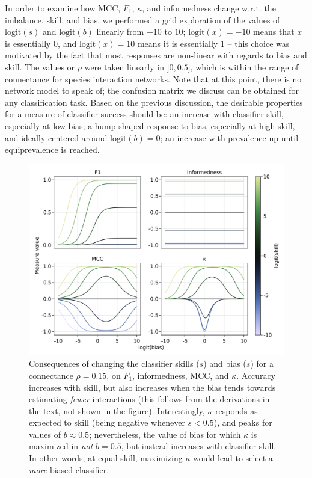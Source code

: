 \documentclass[11pt]{article}
\makeatletter
\def\maxwidth{\ifdim\Gin@nat@width>\linewidth\linewidth
\else\Gin@nat@width\fi}
\let\Oldincludegraphics\includegraphics
\renewcommand{\includegraphics}[1]{\Oldincludegraphics[width=\maxwidth]{#1}}
\makeatother
\begin{document}
In order to examine how MCC, \(F_1\), \(\kappa\), and informedness
change w.r.t. the imbalance, skill, and bias, we performed a grid
exploration of the values of \(\text{logit}(s)\) and \(\text{logit}(b)\)
linearly from \(-10\) to \(10\); \(\text{logit}(x) = -10\) means that
\(x\) is essentially 0, and \(\text{logit}(x) = 10\) means it is
essentially 1 -- this choice was motivated by the fact that most
responses are non-linear with regards to bias and skill. The values or
\(\rho\) were taken linearly in \(]0, 0.5]\), which is within the range
of connectance for species interaction networks. Note that at this
point, there is no network model to speak of; the confusion matrix we
discuss can be obtained for any classification task. Based on the
previous discussion, the desirable properties for a measure of
classifier success should be: an increase with classifier skill,
especially at low bias; a hump-shaped response to bias, especially at
high skill, and ideally centered around \(\text{logit}(b)=0\); an
increase with prevalence up until equiprevalence is reached.

\begin{figure}
\hypertarget{fig:bias}{%
\centering
\includegraphics{figures/changing-bias.png}
\caption{Consequences of changing the classifier skills (\(s\)) and bias
(\(s\)) for a connectance \(\rho=0.15\), on \(F_1\), informedness, MCC,
and \(\kappa\). Accuracy increases with skill, but also increases when
the bias tends towards estimating \emph{fewer} interactions (this
follows from the derivations in the text, not shown in the figure).
Interestingly, \(\kappa\) responds as expected to skill (being negative
whenever \(s < 0.5\)), and peaks for values of \(b \approx 0.5\);
nevertheless, the value of bias for which \(\kappa\) is maximized in
\emph{not} \(b=0.5\), but instead increases with classifier skill. In
other words, at equal skill, maximizing \(\kappa\) would lead to select
a \emph{more} biased classifier.}\label{fig:bias}
}
\end{figure}
\end{document}
